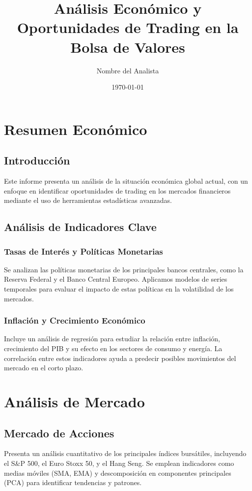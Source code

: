 \documentclass{report}
\title{Análisis Económico y Oportunidades de Trading en la Bolsa de Valores}
\author{Nombre del Analista}
\date{\today}
\begin{document}
\maketitle

\tableofcontents

\chapter{Resumen Económico}
\section{Introducción}
Este informe presenta un análisis de la situación económica global actual, con un enfoque en identificar oportunidades de trading en los mercados financieros mediante el uso de herramientas estadísticas avanzadas.

\section{Análisis de Indicadores Clave}
\subsection{Tasas de Interés y Políticas Monetarias}
Se analizan las políticas monetarias de los principales bancos centrales, como la Reserva Federal y el Banco Central Europeo. Aplicamos modelos de series temporales para evaluar el impacto de estas políticas en la volatilidad de los mercados.

\subsection{Inflación y Crecimiento Económico}
Incluye un análisis de regresión para estudiar la relación entre inflación, crecimiento del PIB y su efecto en los sectores de consumo y energía. La correlación entre estos indicadores ayuda a predecir posibles movimientos del mercado en el corto plazo.

\chapter{Análisis de Mercado}
\section{Mercado de Acciones}
Presenta un análisis cuantitativo de los principales índices bursátiles, incluyendo el S\&P 500, el Euro Stoxx 50, y el Hang Seng. Se emplean indicadores como medias móviles (SMA, EMA) y descomposición en componentes principales (PCA) para identificar tendencias y patrones.
\end{document}
